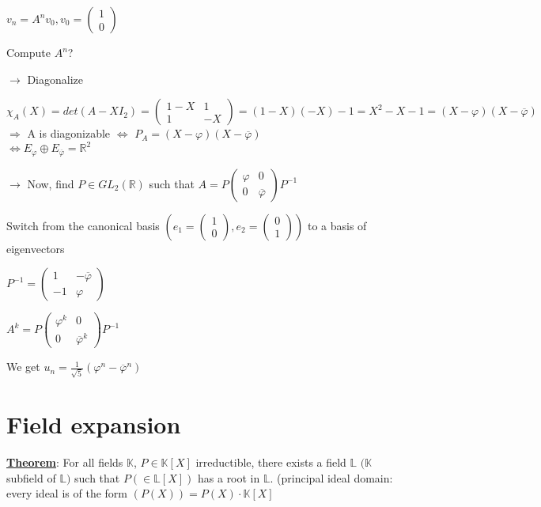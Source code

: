 \documentclass{article}
\begin{document}
$v_n=A^n v_0, v_0=\begin{pmatrix}
    1\\
    0
\end{pmatrix}$

Compute $A^n$?

$\rightarrow$ Diagonalize

$\chi_A(X)=det(A-XI_2) = \begin{pmatrix}
    1-X & 1 \\
    1 & -X
\end{pmatrix}=(1-X)(-X)-1 = X^2-X-1 = (X-\varphi)(X-\overline{\varphi})$ \\

\noindent$\Rightarrow$ A is diagonizable $\Leftrightarrow$ $P_A=(X-\varphi)(X-\overline{\varphi})$ \\
$\Leftrightarrow E_\varphi \oplus E_{\overline{\varphi}} = \mathbb{R}^2$

$\longrightarrow$ Now, find $P\in GL_2(\mathbb{R})$ such that $A=P\begin{pmatrix}
    \varphi & 0 \\
    0 & \overline{\varphi}
\end{pmatrix}P^{-1}$

Switch from the canonical basis $(e_1=\begin{pmatrix} 1 \\ 0 \end{pmatrix}, e_2=\begin{pmatrix}0 \\ 1 \end{pmatrix})$ to a basis of eigenvectors

$P^{-1}=\begin{pmatrix}
    1 & -\overline{\varphi} \\
    -1 & \varphi
\end{pmatrix}$

$A^k=P\begin{pmatrix}
    \varphi^k & 0 \\
    0 & \overline{\varphi}^k
\end{pmatrix}P^{-1}$

We get $u_n=\frac{1}{\sqrt{5}}(\varphi^n-\overline{\varphi}^n)$


\section{Field expansion}
\underline{\textbf{Theorem}}: For all fields $\mathbb{K}$, $P\in\mathbb{K}[X]$ irreductible, there exists a field $\mathbb{L}$ $(\mathbb{K}$ subfield of $\mathbb{L})$ such that $P (\in\mathbb{L}[X])$ has a root in $\mathbb{L}.$ (principal ideal domain: every ideal is of the form $(P(X))=P(X)\cdot\mathbb{K}[X]$\\
\end{document}
